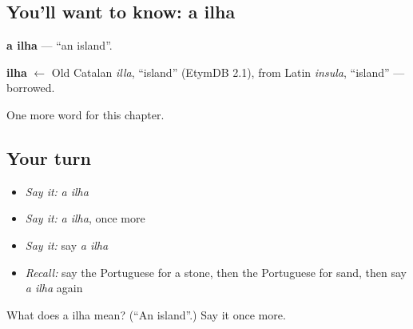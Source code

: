 \subsection*{You'll want to know: a ilha}
\textbf{a ilha} — \textquotedblleft{}an island\textquotedblright{}.

\begin{cousinweb}
\textbf{ilha} $\leftarrow$ Old Catalan \emph{illa}, \textquotedblleft{}island\textquotedblright{} (EtymDB 2.1), from Latin \emph{insula}, \textquotedblleft{}island\textquotedblright{} — borrowed.
\end{cousinweb}

\begin{grammarlens}[title={What you've built}]
One more word for this chapter.
\end{grammarlens}

\subsection*{Your turn}
\begin{itemize}
\raggedright
  \item \emph{Say it:} \emph{a ilha}
  \item \emph{Say it:} \emph{a ilha}, once more
  \item \emph{Say it:} say \emph{a ilha}
  \item \emph{Recall:} say the Portuguese for a stone, then the Portuguese for sand, then say \emph{a ilha} again
\end{itemize}

\begin{tcolorbox}[breakable,colback=teal!4,colframe=teal!35!black,title={Before you move on}]
What does a ilha mean? (\textquotedblleft{}An island\textquotedblright{}.) Say it once more.
\end{tcolorbox}
